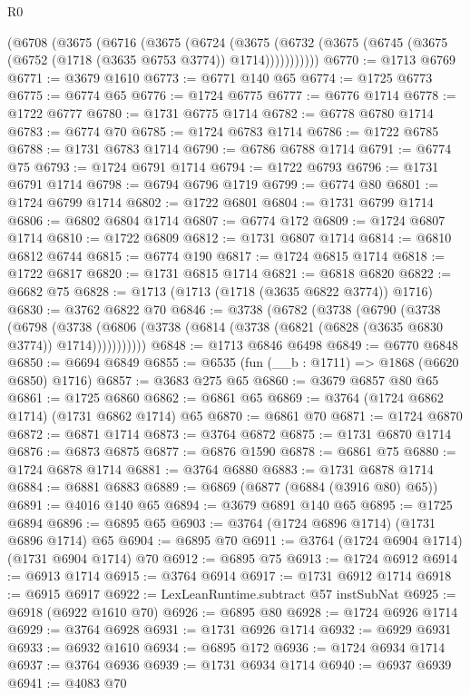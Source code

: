 \begin{lexlean}{R0}
\begin{coremodule}
    (@6708
      (@3675
        (@6716
          (@3675
            (@6724
              (@3675 (@6732 (@3675 (@6745 (@3675 (@6752 (@1718 (@3635 @6753 @3774)) @1714)))))))))))
@6770 := @1713 @6769
@6771 := @3679 @1610
@6773 := @6771 @140 @65
@6774 := @1725 @6773
@6775 := @6774 @65
@6776 := @1724 @6775
@6777 := @6776 @1714
@6778 := @1722 @6777
@6780 := @1731 @6775 @1714
@6782 := @6778 @6780 @1714
@6783 := @6774 @70
@6785 := @1724 @6783 @1714
@6786 := @1722 @6785
@6788 := @1731 @6783 @1714
@6790 := @6786 @6788 @1714
@6791 := @6774 @75
@6793 := @1724 @6791 @1714
@6794 := @1722 @6793
@6796 := @1731 @6791 @1714
@6798 := @6794 @6796 @1719
@6799 := @6774 @80
@6801 := @1724 @6799 @1714
@6802 := @1722 @6801
@6804 := @1731 @6799 @1714
@6806 := @6802 @6804 @1714
@6807 := @6774 @172
@6809 := @1724 @6807 @1714
@6810 := @1722 @6809
@6812 := @1731 @6807 @1714
@6814 := @6810 @6812 @6744
@6815 := @6774 @190
@6817 := @1724 @6815 @1714
@6818 := @1722 @6817
@6820 := @1731 @6815 @1714
@6821 := @6818 @6820
@6822 := @6682 @75
@6828 := @1713 (@1713 (@1718 (@3635 @6822 @3774)) @1716)
@6830 := @3762 @6822 @70
@6846 := @3738
    (@6782
      (@3738
        (@6790
          (@3738
            (@6798
              (@3738 (@6806 (@3738 (@6814 (@3738 (@6821 (@6828 (@3635 @6830 @3774)) @1714)))))))))))
@6848 := @1713 @6846 @6498
@6849 := @6770 @6848
@6850 := @6694 @6849
@6855 := @6535 (fun (__b : @1711) => @1868 (@6620 @6850) @1716)
@6857 := @3683 @275 @65
@6860 := @3679 @6857 @80 @65
@6861 := @1725 @6860
@6862 := @6861 @65
@6869 := @3764 (@1724 @6862 @1714) (@1731 @6862 @1714) @65
@6870 := @6861 @70
@6871 := @1724 @6870
@6872 := @6871 @1714
@6873 := @3764 @6872
@6875 := @1731 @6870 @1714
@6876 := @6873 @6875
@6877 := @6876 @1590
@6878 := @6861 @75
@6880 := @1724 @6878 @1714
@6881 := @3764 @6880
@6883 := @1731 @6878 @1714
@6884 := @6881 @6883
@6889 := @6869 (@6877 (@6884 (@3916 @80) @65))
@6891 := @4016 @140 @65
@6894 := @3679 @6891 @140 @65
@6895 := @1725 @6894
@6896 := @6895 @65
@6903 := @3764 (@1724 @6896 @1714) (@1731 @6896 @1714) @65
@6904 := @6895 @70
@6911 := @3764 (@1724 @6904 @1714) (@1731 @6904 @1714) @70
@6912 := @6895 @75
@6913 := @1724 @6912
@6914 := @6913 @1714
@6915 := @3764 @6914
@6917 := @1731 @6912 @1714
@6918 := @6915 @6917
@6922 := LexLeanRuntime.subtract @57 instSubNat
@6925 := @6918 (@6922 @1610 @70)
@6926 := @6895 @80
@6928 := @1724 @6926 @1714
@6929 := @3764 @6928
@6931 := @1731 @6926 @1714
@6932 := @6929 @6931
@6933 := @6932 @1610
@6934 := @6895 @172
@6936 := @1724 @6934 @1714
@6937 := @3764 @6936
@6939 := @1731 @6934 @1714
@6940 := @6937 @6939
@6941 := @4083 @70

\end{coremodule}
\end{lexlean}
